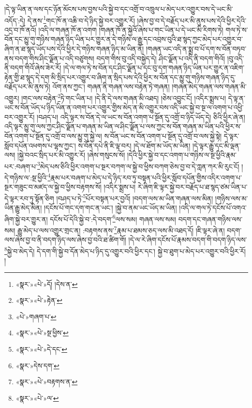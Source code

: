 །དེ་ལྟ་ཡིན་ན་ལས་དང་ཉོན་མོངས་པས་བྱས་པའི་སྐྱེ་བ་དང་འགྲོ་བ་འཁྲུལ་པ་མེད་པར་འགྱུར་བས་དེ་ཡང་མི་འདོད་:དེ། དེ་ནས་\footnote{«སྣར་»«པེ་»དོ། །དེས་ན་}གང་ཁོ་ན་འཆི་བ་དེ་ཉིད་སྐྱེ་བར་འགྱུར་རོ། །ཞེས་བྱ་བ་དེ་བརྗོད་པར་མི་ནུས་པས་དེའི་ཕྱིར་དེའི་འདྲ་བ་ཁོ་ནའོ། །འདི་ལ་གཞན་ཁོ་ན་འགག །གཞན་ཁོ་ན་སྐྱེའོ་ཞེས་པ་གང་ཡིན་པ་དེ་ཡང་མི་རིགས་ཏེ། གལ་ཏེ་ས་བོན་དང་མྱུ་གུ་གཉིས་གཞན་ཉིད་ཡིན་པར་གྱུར་ན་དེ་གཉིས་ལ་རྒྱུ་དང་འབྲས་བུའི་ཐ་སྙད་ཀྱང་མེད་པར་འགྱུར་བ་ཞིག་ན་ཐ་སྙད་ཡོད་པས་དེའི་ཕྱིར་དེ་གཉིས་གཞན་ཉིད་མ་ཡིན་ནོ། །གཞན་ཡང་འདི་ན་སྨྲ་བ་པོ་དག་ས་བོན་བཏབ་ནས་བདག་གིས་ཤིང་ལྗོན་པ་འདི་བཙུགས། བདག་གིས་བུ་འདི་བསྐྱེད་དེ། ཤིང་ལྗོན་པ་འདི་ནི་བདག་གིའོ། །བུ་འདི་ནི་བདག་གིའོ་ཞེས་ཟེར་རོ། །དེ་ལ་གལ་ཏེ་ས་བོན་དང་ཤིང་ལྗོན་པ་དང་བུ་དག་གཞན་ཉིད་ཡིན་པར་གྱུར་ན་འཇིག་རྟེན་གྱི་ཐ་སྙད་དེ་དག་མི་སྲིད་པར་འགྱུར་བ་ཞིག་ན་སྲིད་པས་དེའི་ཕྱིར་ས་བོན་དང་མྱུ་གུ་གཉིས་གཞན་ཉིད་དུ་བརྗོད་པར་མི་ནུས་ཏེ། འོག་ནས་ཀྱང་། གཞན་ནི་གཞན་ལས་བརྟེན་ཏེ་གཞན། །གཞན་མེད་གཞན་ལས་གཞན་མི་འགྱུར། །གང་ལས་བརྟེན་\footnote{«སྣར་»«པེ་»རྟེན་}ཏེ་གང་ཡིན་པ། །དེ་ནི་དེ་ལས་གཞན་མི་འཐད། །ཅེས་འབྱུང་ངོ། །འདིར་སྨྲས་པ། དེ་ལྟ་ན་ཡང་ས་བོན་ཡོད་པ་ཉིད་ཡིན་ན་འགག་པར་འགྱུར་གྱིས་མེད་ན་མི་འགྱུར་བས་འདི་ཡང་སྐྱེ་བ་སྔ་ལ་འགག་པ་འཕྱི་བར་འགྱུར་རོ། །བཤད་པ། འདི་ལྟར་ས་བོན་དེ་ལ་ཡང་ས་བོན་འགག་པ་སྔོན་དུ་འགྲོ་བ་ཉིད་ཡོད་དེ། ཅིའི་ཕྱིར་ཞེ་ན། འདི་ལྟར་མྱུ་གུ་ལས་ཀྱང་ཤིང་ལྗོན་པ་གཞན་མ་ཡིན་ལ་ཤིང་ལྗོན་པ་ལས་ཀྱང་ས་བོན་གཞན་མ་ཡིན་པའི་ཕྱིར་ས་བོན་འགག་པ་སྔོན་དུ་འགྲོ་བ་ལས་མྱུ་གུ་སྐྱེ་ལ། ས་བོན་ཡང་ས་བོན་འགག་པ་སྔོན་དུ་འགྲོ་བ་ལས་སྐྱེ་སྟེ། དེ་ལྟར་སློབ་དཔོན་འཕགས་པ་ལྷས་ཀྱང་། ས་བོན་དཔེ་ནི་ཇི་ལྟ་བར། །དེ་ལ་ཐོག་མ་ཡོད་མ་ཡིན། །དེ་ལྟར་རྒྱུ་དང་མི་ལྡན་ལས། །སྐྱེ་བའང་སྲིད་པར་མི་འགྱུར་རོ། །ཞེས་གསུངས་སོ། །དེའི་ཕྱིར་སྐྱེ་བ་དང་འགག་པ་གཉིས་ལ་སྔ་ཕྱིའི་རྣམ་པར་:བཞག་པ་\footnote{«པེ་»གཞག་པ་}མེད་པས་ཅིའི་ཕྱིར་འགག་པ་སྔར་བཀག་ལ་སྐྱེ་བ་ཕྱིས་བཀག་ཅེས་བྱ་བ་དེ་ཀླན་ཀར་མི་རུང་ངོ། །དེ་གཉིས་ལ་:སྔ་ཕྱིའི་\footnote{«སྣར་»«པེ་»སྔ་ཕྱིས་}རྣམ་པར་བཞག་པ་མེད་པ་དེ་ཉིད་རབ་ཏུ་བསྟན་པའི་ཕྱིར་སློབ་དཔོན་གྱིས་འདིར་འགག་པ་སྔར་གཟུང་བ་མཛད་ལ་སྐྱེ་བ་ཕྱིས་བརྟགས་སོ། །འདིར་སྨྲས་པ། རེ་ཞིག་ཇི་ལྟར་སྐྱེ་བར་བརྗོད་པ་ཐ་སྙད་ཙམ་ཡིན་པ་དེ་ལྟར་རབ་ཏུ་སྟོན་ཅིག །བཤད་པ་ཏེ་\footnote{«སྣར་»«པེ་»དེ་དང་}པོར་བསྟན་པར་བྱའོ། །བདག་ལས་མ་ཡིན་གཞན་ལས་མིན། །གཉིས་ལས་མ་ཡིན་རྒྱུ་མེད་མིན། །དངོས་པོ་གང་དག་གང་ན་ཡང་། །སྐྱེ་བ་ནམ་ཡང་ཡོད་མ་ཡིན། །འདི་ལ་གལ་ཏེ་དངོས་པོ་འགའ་ཞིག་སྐྱེ་བར་གྱུར་ན། དངོས་པོ་དེའི་སྐྱེ་བ་:དེ་བདག་\footnote{«སྣར་»དེས་དག་}ལས་སམ། གཞན་ལས་སམ། བདག་དང་གཞན་གཉིས་ལས་སམ། རྒྱུ་མེད་པ་ལས་འགྱུར་གྲང་ན། :བརྟགས་ནས་\footnote{«སྣར་»«པེ་»བརྟགས་ན་}རྣམ་པ་ཐམས་ཅད་ལས་མི་འཐད་དོ། །ཇི་ལྟར་ཞེ་ན། བདག་ལས་ཞེས་བྱ་བ་ནི་བདག་ཉིད་ལས་ཞེས་བྱ་བའི་ཐ་ཚིག་གོ། །དེ་ལ་རེ་ཞིག་དངོས་པོ་རྣམས་བདག་གི་བདག་ཉིད་ལས་\footnote{«སྣར་»«པེ་»ལ་}སྐྱེ་བ་མེད་དེ། དེ་དག་གི་སྐྱེ་བ་དོན་མེད་པ་ཉིད་དུ་འགྱུར་བའི་ཕྱིར་དང་། སྐྱེ་བ་ཐུག་པ་མེད་པར་འགྱུར་བའི་ཕྱིར་རོ། །
